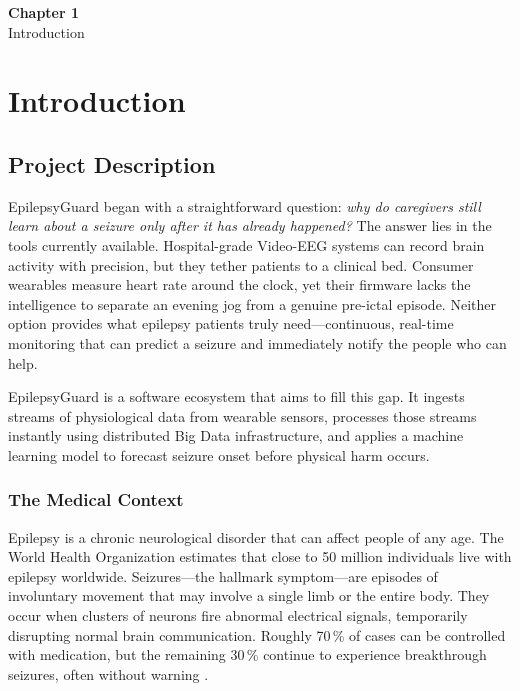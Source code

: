 \documentclass[12pt, a4paper, oneside]{report}
\newcommand{\chapterpage}[2]{
    \cleardoublepage
    \thispagestyle{empty}
    \vspace*{\fill}
    \begin{center}
        \huge \textbf{Chapter #1} \\
        \vspace{1cm}
        \Huge #2
    \end{center}
    \vspace*{\fill}
    \newpage
}
\begin{document}
\clearpage
\tableofcontents

\newpage
\listoffigures

\newpage
\listoftables


\clearpage
{}
\setcounter{page}{1}
\pagestyle{mainpagestyle}


\chapterpage{1}{Introduction}
\chapter{Introduction}

\section{Project Description}
EpilepsyGuard began with a straightforward question: \emph{why do caregivers still learn about a seizure only after it has already happened?} The answer lies in the tools currently available. Hospital-grade Video-EEG systems can record brain activity with precision, but they tether patients to a clinical bed. Consumer wearables measure heart rate around the clock, yet their firmware lacks the intelligence to separate an evening jog from a genuine pre-ictal episode. Neither option provides what epilepsy patients truly need---continuous, real-time monitoring that can predict a seizure and immediately notify the people who can help.

EpilepsyGuard is a software ecosystem that aims to fill this gap. It ingests streams of physiological data from wearable sensors, processes those streams instantly using distributed Big Data infrastructure, and applies a machine learning model to forecast seizure onset before physical harm occurs.

\subsection{The Medical Context}
Epilepsy is a chronic neurological disorder that can affect people of any age. The World Health Organization estimates that close to 50 million individuals live with epilepsy worldwide. Seizures---the hallmark symptom---are episodes of involuntary movement that may involve a single limb or the entire body. They occur when clusters of neurons fire abnormal electrical signals, temporarily disrupting normal brain communication. Roughly 70\,\% of cases can be controlled with medication, but the remaining 30\,\% continue to experience breakthrough seizures, often without warning \cite{ref1}.
\end{document}
